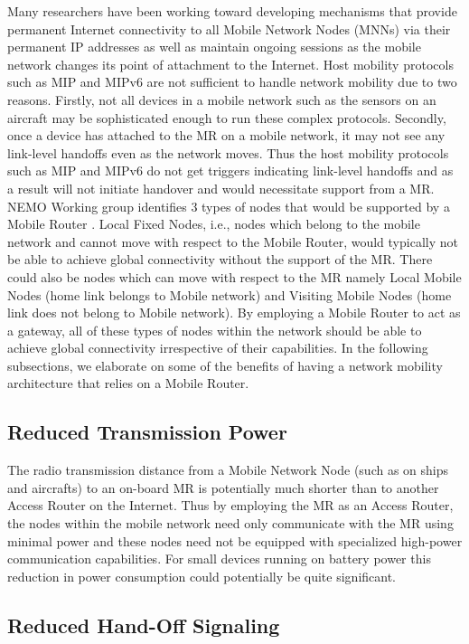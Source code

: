 Many researchers have been working toward developing mechanisms that provide
permanent Internet connectivity to all Mobile Network Nodes (MNNs) via their
permanent IP addresses as well as maintain ongoing sessions as the mobile
network changes its point of attachment to the Internet. Host mobility
protocols such as MIP and MIPv6 are not sufficient to handle network mobility
due to two reasons. Firstly, not all devices in a mobile network such as the
sensors on an aircraft may be sophisticated enough to run these complex
protocols. Secondly, once a device has attached to the MR on a mobile network, it may not see any link-level handoffs even as the network moves. Thus the host mobility protocols such as MIP and MIPv6 do not get triggers indicating link-level handoffs and as a result will not initiate handover and would necessitate support from a MR.
NEMO Working group identifies 3 types of nodes that would be supported by a Mobile Router \cite{6}. Local Fixed Nodes, i.e., nodes which belong to the mobile network and cannot move with respect to the Mobile Router, would typically not be able to achieve global connectivity
without the support of the MR. There could also be nodes which can move with
respect to the MR namely Local Mobile Nodes (home link belongs to Mobile
network) and Visiting Mobile Nodes (home link does not belong to Mobile
network). By employing a Mobile Router to act as a gateway, all of these types of nodes within the network should be able to achieve global connectivity irrespective of their capabilities. In the following subsections, we elaborate on some of the benefits of having a network mobility architecture that relies on a Mobile Router.

\subsection{Reduced Transmission Power}

The radio transmission distance from a Mobile Network Node (such as on ships
and aircrafts) to an on-board MR is potentially much shorter than to another
Access Router on the Internet. Thus by employing the MR as an Access Router,
the nodes within the mobile network need only communicate with the MR using
minimal power and these nodes need not be equipped with specialized high-power
communication capabilities. For small devices running on battery power this
reduction in power consumption could potentially be quite significant.

\subsection{Reduced Hand-Off Signaling}

